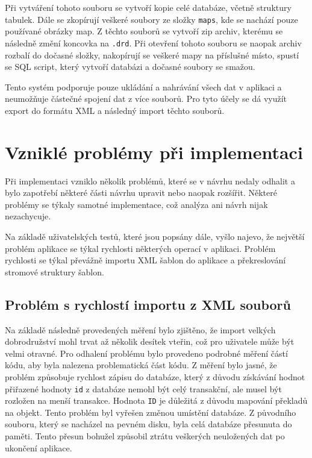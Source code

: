 \documentclass[thesis=B,czech]{resources/FITthesis}[2012/06/26]
\begin{document}
Při vytváření tohoto souboru se vytvoří kopie celé databáze, včetně struktury tabulek. Dále se zkopírují veškeré soubory ze složky \texttt{maps}, kde se nachází pouze používané obrázky map. Z těchto souborů se vytvoří zip archiv, kterému se následně změní koncovka na \texttt{.drd}. Při otevření tohoto souboru se naopak archiv rozbalí do dočasné složky, nakopírují se veškeré mapy na příslušné místo, spustí se SQL script, který vytvoří databázi a dočasné soubory se smažou. \par

Tento systém podporuje pouze ukládání a nahrávání všech dat v aplikaci a neumožňuje částečné spojení dat z více souborů. Pro tyto účely se dá využít export do formátu XML a následný import těchto souborů. 


\section{Vzniklé problémy při implementaci}
\label{problemy_implementace}
Při implementaci vzniklo několik problémů, které se v návrhu nedaly odhalit a bylo zapotřebí některé části návrhu upravit nebo naopak rozšířit. Některé problémy se týkaly samotné implementace, což analýza ani návrh nijak nezachycuje. \par 

Na základě uživatelských testů, které jsou popsány dále, vyšlo najevo, že největší problém aplikace se týkal rychlosti některých operací v aplikaci. Problém rychlosti se týkal převážně importu XML šablon do aplikace a překreslování stromové struktury šablon.

	\subsection{Problém s rychlostí importu z XML souborů}
Na základě následně provedených měření bylo zjištěno, že import velkých dobrodružství mohl trvat až několik desítek vteřin, což pro uživatele může být velmi otravné. Pro odhalení problému bylo provedeno podrobné měření částí kódu, aby byla nalezena problematická část kódu. Z měření bylo jasné, že problém způsobuje rychlost zápisu do databáze, který z důvodu získávání hodnot přiřazené hodnoty \texttt{id} z databáze nemohl být celý transakční, ale musel být rozložen na menší transakce. Hodnota \texttt{ID} je důležitá z důvodu mapování překladů na objekt. Tento problém byl vyřešen změnou umístění databáze. Z původního souboru, který se nacházel na pevném disku, byla celá databáze přesunuta do paměti. Tento přesun bohužel způsobil ztrátu veškerých neuložených dat po ukončení aplikace. \par 
\end{document}
